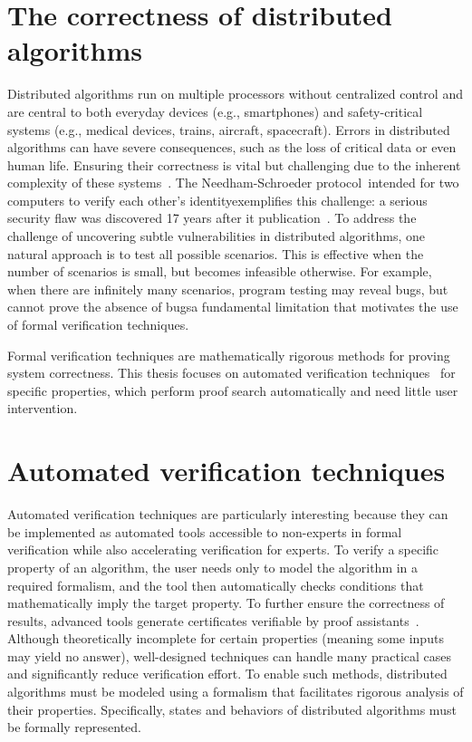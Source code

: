
\section{The correctness of distributed algorithms}
Distributed algorithms run on multiple processors without centralized control and are central to both everyday devices (e.g., smartphones) and safety-critical systems (e.g., medical devices, trains, aircraft, spacecraft).
Errors in distributed algorithms can have severe consequences, such as the loss of critical data or even human life. Ensuring their correctness is vital but challenging due to the inherent complexity of these systems~\cite{heiser2010theroad, lamport2019thebyzantine}. 
The Needham-Schroeder protocol~\cite{needham1978using}\textemdash intended for two computers to verify each other's identity\textemdash exemplifies this challenge: a serious security flaw was discovered 17 years after it publication~\cite{lowe1996breaking}.
To address the challenge of uncovering subtle vulnerabilities in distributed algorithms, one natural approach is to test all possible scenarios. This is effective when the number of scenarios is small, but becomes infeasible otherwise. For example, when there are infinitely many scenarios, program testing may reveal bugs, but cannot prove the absence of bugs\textemdash a fundamental limitation that motivates the use of formal verification techniques.

Formal verification techniques are mathematically rigorous methods for proving system correctness. 
This thesis focuses on automated verification techniques~\cite{clarke2018model, contejean2011automated, cortier2014formal, urbain2004modular,steinbach1995simplification,kassing2024dependency,marche2004modular} for specific properties, which perform proof search automatically and need little user intervention.
   
\section{Automated verification techniques}
Automated verification techniques are particularly interesting because they can be implemented as automated tools accessible to non-experts in formal verification while also accelerating verification for experts.
To verify a specific property of an algorithm, the user needs only to model the algorithm in a required formalism, and the tool then automatically checks conditions that mathematically imply the target property. To further ensure the correctness of results, advanced tools generate certificates verifiable by proof assistants~\cite{contejean2011automated}. 
Although theoretically incomplete for certain properties (meaning some inputs may yield no answer), well-designed techniques can handle many practical cases and significantly reduce verification effort. 
To enable such methods, distributed algorithms must be modeled using a formalism that facilitates rigorous analysis of their properties. Specifically, states and behaviors of distributed algorithms must be formally represented.

